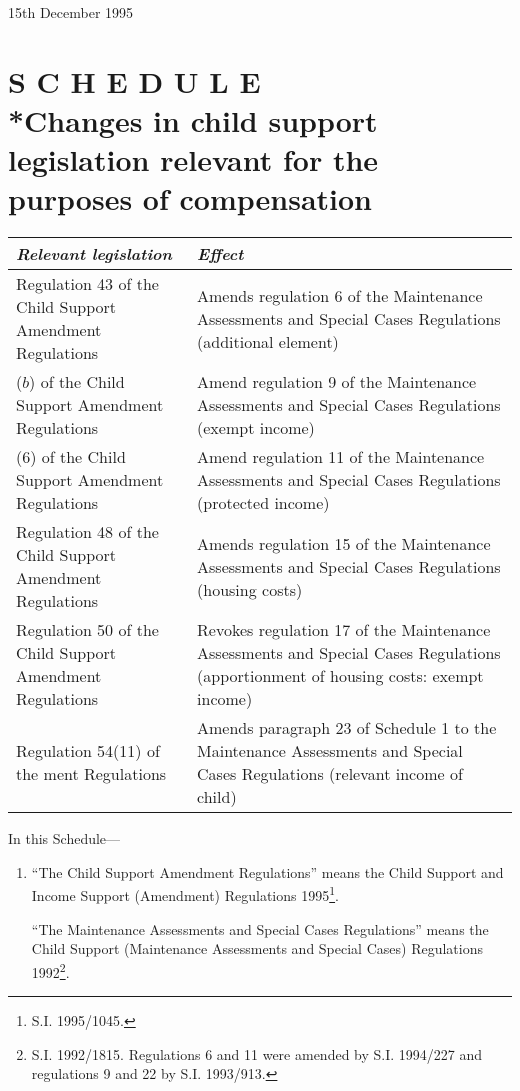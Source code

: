\documentclass[a4paper]{article}
\newcommand{\parthead}{}
\begin{document}
15th December 1995

\clearpage

\part[Schedule --- Changes in child support legislation relevant for the purposes of compensation]{S C H E D U L E\\*Changes in child support legislation relevant for the purposes of compensation}

\renewcommand\parthead{--- Schedule}

\noindent
\begin{tabulary}{\linewidth}{JJ}
\hline
\itshape Relevant legislation & \itshape Effect\\
\hline
Regulation 43 of the Child Support Amendment Regulations&Amends regulation 6 of the Maintenance Assessments and Special Cases Regulations (additional element)\\
 ($b$) of the Child Support Amendment Regulations&Amend regulation 9 of the Maintenance Assessments and Special Cases Regulations (exempt income)\\
 (6) of the Child Support Amendment Regulations&Amend regulation 11 of the Maintenance Assessments and Special Cases Regulations (protected income)\\
Regulation 48 of the Child Support Amendment Regulations&Amends regulation 15 of the Maintenance Assessments and Special Cases Regulations (housing costs)\\
Regulation 50 of the Child Support Amendment Regulations&Revokes regulation 17 of the Maintenance Assessments and Special Cases Regulations (apportionment of housing costs: exempt income)\\
Regulation 54(11) of the ment Regulations&Amends paragraph 23 of Schedule 1 to the Maintenance Assessments and Special Cases Regulations (relevant income of child)\\
\hline
\end{tabulary}

In this Schedule—
\begin{enumerate}\item[]
“The Child Support Amendment Regulations” means the Child Support and Income Support (Amendment) Regulations 1995\footnote{\frenchspacing S.I. 1995/1045.}.

“The Maintenance Assessments and Special Cases Regulations” means the Child Support (Maintenance Assessments and Special Cases) Regulations 1992\footnote{\frenchspacing S.I. 1992/1815. Regulations 6 and 11 were amended by S.I. 1994/227 and regulations 9 and 22 by S.I. 1993/913.}.
\end{enumerate}
\end{document}
